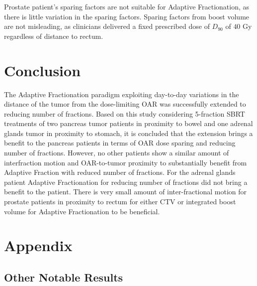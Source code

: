 \documentclass[\relativeRoot/ada.tex]{subfiles}
\begin{document}
Prostate patient's sparing factors are not suitable for Adaptive Fractionation, as there is little variation in the sparing factors. Sparing factors from boost volume are not misleading, as clinicians delivered a fixed prescribed dose of $D_{90}$ of $40$ Gy regardless of distance to rectum.


\section{Conclusion}

The Adaptive Fractionation paradigm exploiting day-to-day variations in the distance of the tumor from the dose-limiting OAR was successfully extended to reducing number of fractions. Based on this study considering 5-fraction SBRT treatments of two pancreas tumor patients in proximity to bowel and one adrenal glands tumor in proximity to stomach, it is concluded that the extension brings a benefit to the pancreas patients in terms of OAR dose sparing and reducing number of fractions. However, no other patients show a similar amount of interfraction motion and OAR-to-tumor proximity to substantially benefit from Adaptive Fraction with reduced number of fractions. For the adrenal glands patient Adaptive Fractionation for reducing number of fractions did not bring a benefit to the patient. There is very small amount of inter-fractional motion for prostate patients in proximity to rectum for either CTV or integrated boost volume for Adaptive Fractionation to be beneficial.


\clearpage
\newpage

\printbibliography{}

\newpage

\section*{Appendix}

%


\renewcommand{\thesubsection}{\Alph{subsection}}
\renewcommand\thefigure{\thesubsection.\arabic{figure}}

\setcounter{figure}{0}
\setcounter{subsection}{0}


\subsection{Other Notable Results}
\end{document}
